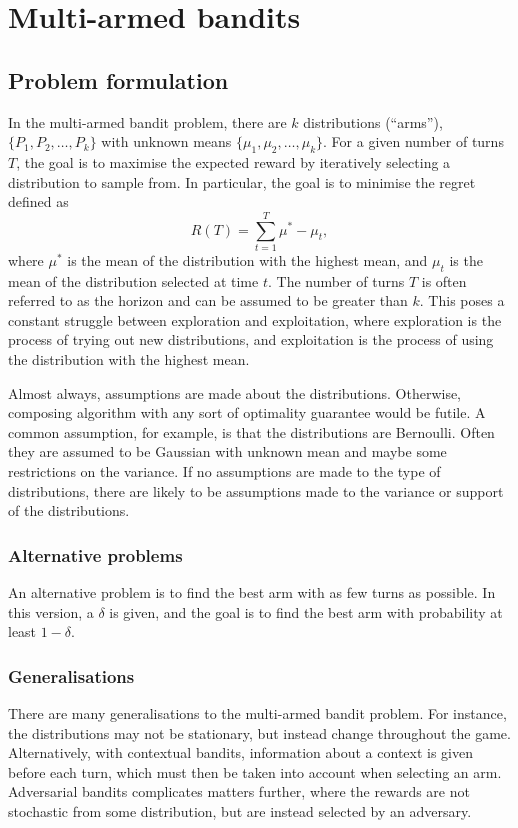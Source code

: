 \chapter{Multi-armed bandits}
\label{chap:bandits}

\section{Problem formulation}
In the multi-armed bandit problem, there are $k$ distributions (\enquote{arms}), $\{P_1, P_2,\dots,P_k\}$ with unknown means $\{\mu_1, \mu_2,\dots,\mu_k\}$.
For a given number of turns $T$, the goal is to maximise the expected reward by iteratively selecting a distribution to sample from.
In particular, the goal is to minimise the regret defined as
\begin{equation}
    R(T) = \sum_{t=1}^T \mu^* - \mu_t,
\end{equation}
where $\mu^*$ is the mean of the distribution with the highest mean, and $\mu_t$ is the mean of the distribution selected at time $t$.
The number of turns $T$ is often referred to as the horizon and can be assumed to be greater than $k$.
This poses a constant struggle between exploration and exploitation, where exploration is the process of trying out new distributions, and exploitation is the process of using the distribution with the highest mean.

Almost always, assumptions are made about the distributions.
Otherwise, composing algorithm with any sort of optimality guarantee would be futile.
A common assumption, for example, is that the distributions are Bernoulli.
Often they are assumed to be Gaussian with unknown mean and maybe some restrictions on the variance.
If no assumptions are made to the type of distributions, there are likely to be assumptions made to the variance or support of the distributions.

\subsection{Alternative problems}
An alternative problem is to find the best arm with as few turns as possible.
In this version, a $\delta$ is given, and the goal is to find the best arm with probability at least $1-\delta$.

\subsection{Generalisations}
There are many generalisations to the multi-armed bandit problem.
For instance, the distributions may not be stationary, but instead change throughout the game.
Alternatively, with contextual bandits, information about a context is given before each turn, which must then be taken into account when selecting an arm.
Adversarial bandits complicates matters further, where the rewards are not stochastic from some distribution, but are instead selected by an adversary.



